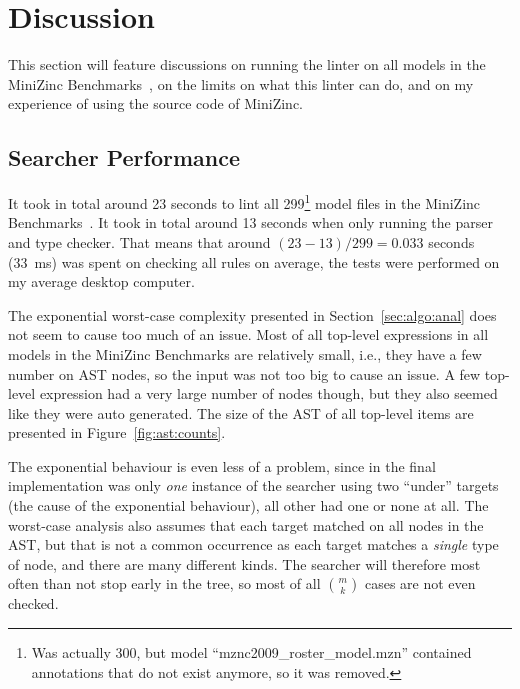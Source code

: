 \documentclass[a4paper,12pt]{article}
\begin{document}
\section{Discussion}\label{sec:discussion}
This section will feature discussions on running the linter on all models in the MiniZinc
Benchmarks~\cite{mznbench}, on the limits on what this linter can do, and on my experience
of using the source code of MiniZinc.

\subsection{Searcher Performance}\label{sec:discussion:searcher}
It took in total around 23 seconds to lint all 299\footnote{Was actually 300, but model
  ``mznc2009\_roster\_model.mzn'' contained annotations that do not exist anymore, so it was
  removed.} model
files in the MiniZinc Benchmarks~\cite{mznbench}. It took in total around 13 seconds when
only running the parser and type checker. That means that around $(23-13)/299 = 0.033$
seconds (\SI{33}{\milli\second}) was spent on checking all rules on average, the tests
were performed on my average desktop computer.

The exponential
worst-case complexity presented in Section~\ref{sec:algo:anal} does not seem to cause too much
of an issue. Most of all top-level expressions in all models in the MiniZinc Benchmarks are
relatively small, i.e., they have a few number on AST nodes,
so the input was not too big to cause an issue.
A few top-level expression had a very large number
of nodes though, but they also seemed like they were auto generated.
The size of the AST of all top-level items are presented in Figure~\ref{fig:ast:counts}.



The exponential behaviour is even less of a problem, since in the final implementation was
only \emph{one} instance of the searcher using two ``under'' targets (the cause of the
exponential behaviour), all other had one or none at all. The worst-case analysis also
assumes that each target matched on all nodes in the AST, but that is not a common
occurrence as each target matches a \emph{single} type of node, and there are many
different kinds. The searcher will therefore most often than not stop early in the tree,
so most of all $\binom{m}{k}$ cases are not even checked.
\end{document}
